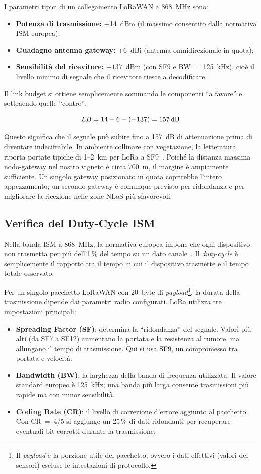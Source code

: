 \noindent I parametri tipici di un collegamento LoRaWAN a 868~MHz sono:
\begin{itemize}
    \item \textbf{Potenza di trasmissione:} +14~dBm (il massimo consentito dalla normativa ISM europea);
    \item \textbf{Guadagno antenna gateway:} +6~dBi (antenna omnidirezionale in quota);
    \item \textbf{Sensibilità del ricevitore:} $-137$~dBm (con SF9 e BW~=~125~kHz), cioè il livello minimo di segnale che il ricevitore riesce a decodificare.
\end{itemize}

\noindent Il link budget si ottiene semplicemente sommando le componenti ``a favore'' e sottraendo quelle ``contro'':

\[
    LB = 14 + 6 - (-137) = 157 \text{\,dB}
\]

\noindent Questo significa che il segnale può subire fino a 157~dB di attenuazione prima di diventare indecifrabile. In ambiente collinare con vegetazione, la letteratura riporta portate tipiche di 1--2~km per LoRa a SF9~\cite{LoRa}. Poiché la distanza massima nodo-gateway nel nostro vigneto è circa 700~m, il margine è ampiamente sufficiente. Un singolo gateway posizionato in quota coprirebbe l'intero appezzamento; un secondo gateway è comunque previsto per ridondanza e per migliorare la ricezione nelle zone NLoS più sfavorevoli.

\subsection{Verifica del Duty-Cycle ISM}

Nella banda ISM a 868~MHz, la normativa europea impone che ogni dispositivo non trasmetta per più dell'1\,\% del tempo su un dato canale~\cite{etsi300220}. Il \textit{duty-cycle} è semplicemente il rapporto tra il tempo in cui il dispositivo trasmette e il tempo totale osservato.

Per un singolo pacchetto LoRaWAN con 20~byte di \textit{payload}\footnote{Il \textit{payload} è la porzione utile del pacchetto, ovvero i dati effettivi (valori dei sensori) escluse le intestazioni di protocollo.}, la durata della trasmissione dipende dai parametri radio configurati. LoRa utilizza tre impostazioni principali:
\begin{itemize}
	\item \textbf{Spreading Factor (SF)}: determina la ``ridondanza'' del segnale. Valori più alti (da SF7 a SF12) aumentano la portata e la resistenza al rumore, ma allungano il tempo di trasmissione. Qui si usa SF9, un compromesso tra portata e velocità.
	\item \textbf{Bandwidth (BW)}: la larghezza della banda di frequenza utilizzata. Il valore standard europeo è 125~kHz; una banda più larga consente trasmissioni più rapide ma con minor sensibilità.
	\item \textbf{Coding Rate (CR)}: il livello di correzione d'errore aggiunto al pacchetto. Con CR~=~4/5 si aggiunge un 25\,\% di dati ridondanti per recuperare eventuali bit corrotti durante la trasmissione.
\end{itemize}

